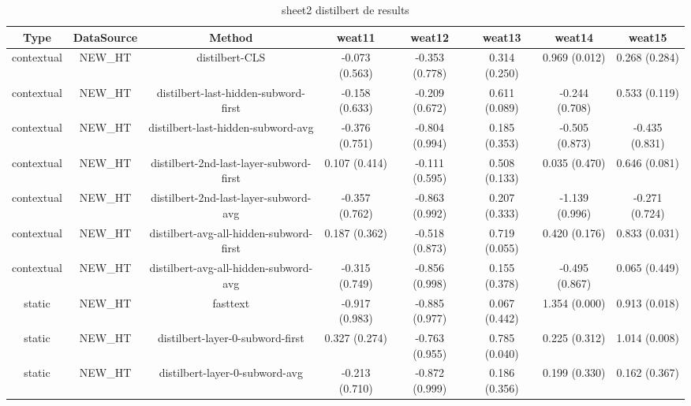 \begin{sidewaystable}[htb]
    \centering
    \caption{sheet2 distilbert de results}
    \label{appendix_tab:sheet2_distilbert_de_results}
    \small
    \begin{tabular}{@{}cccccccc@{}}
        \toprule
        Type & DataSource & Method & weat11 & weat12 & weat13 & weat14 & weat15 \\
        \midrule
        contextual & NEW\_HT & distilbert-CLS & -0.073 (0.563) & -0.353 (0.778) & 0.314 (0.250) & 0.969 (0.012) & 0.268 (0.284) \\
        contextual & NEW\_HT & distilbert-last-hidden-subword-first & -0.158 (0.633) & -0.209 (0.672) & 0.611 (0.089) & -0.244 (0.708) & 0.533 (0.119) \\
        contextual & NEW\_HT & distilbert-last-hidden-subword-avg & -0.376 (0.751) & -0.804 (0.994) & 0.185 (0.353) & -0.505 (0.873) & -0.435 (0.831) \\
        contextual & NEW\_HT & distilbert-2nd-last-layer-subword-first & 0.107 (0.414) & -0.111 (0.595) & 0.508 (0.133) & 0.035 (0.470) & 0.646 (0.081) \\
        contextual & NEW\_HT & distilbert-2nd-last-layer-subword-avg & -0.357 (0.762) & -0.863 (0.992) & 0.207 (0.333) & -1.139 (0.996) & -0.271 (0.724) \\
        contextual & NEW\_HT & distilbert-avg-all-hidden-subword-first & 0.187 (0.362) & -0.518 (0.873) & 0.719 (0.055) & 0.420 (0.176) & 0.833 (0.031) \\
        contextual & NEW\_HT & distilbert-avg-all-hidden-subword-avg & -0.315 (0.749) & -0.856 (0.998) & 0.155 (0.378) & -0.495 (0.867) & 0.065 (0.449) \\
        static & NEW\_HT & fasttext & -0.917 (0.983) & -0.885 (0.977) & 0.067 (0.442) & 1.354 (0.000) & 0.913 (0.018) \\
        static & NEW\_HT & distilbert-layer-0-subword-first & 0.327 (0.274) & -0.763 (0.955) & 0.785 (0.040) & 0.225 (0.312) & 1.014 (0.008) \\
        static & NEW\_HT & distilbert-layer-0-subword-avg & -0.213 (0.710) & -0.872 (0.999) & 0.186 (0.356) & 0.199 (0.330) & 0.162 (0.367) \\
        \bottomrule
    \end{tabular}
\end{sidewaystable}